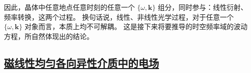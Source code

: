 因此，晶体中任意地点任意时刻的任意一个 $\{{\omega, \symbf{k}}\}$ 组分，同时参与：线性衍射、频率转换，这两个过程。
换句话说，线性、非线性光学过程，对于任意一个 $\{{\omega, \symbf{k}}\}$ 对象而言，本质上均不可解耦。
这是接下来将要推导的时空频率域的波动方程，所自然体现出的结论。

\subsection{\protect\hyperlink{chap:\thesubsection}{磁线性均匀各向异性介质中的电场}}
\label{磁线性均匀各向异性介质中的电场}

